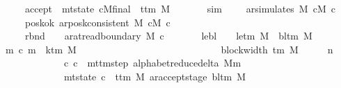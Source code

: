 \begin{isabellebody}
\ \ \ \ \ \ \ accept{\isacharcolon}{\kern0pt}\ \ {\isachardoublequoteopen}mt{\isacharunderscore}{\kern0pt}state\ cM{\isacharunderscore}{\kern0pt}final\ {\isacharequal}{\kern0pt}\ t{\isacharunderscore}{\kern0pt}tm\ M{\isachardoublequoteclose}\isanewline
\ \ \ \ \ \ \ sim{\isacharcolon}{\kern0pt}\ \ \ \ \ {\isachardoublequoteopen}ar{\isacharunderscore}{\kern0pt}simulates\ M\ cM\ c{\isacharprime}{\kern0pt}{\isachardoublequoteclose}\isanewline
\ \ \ \ \ \ \ posk{\isacharunderscore}{\kern0pt}ok{\isacharcolon}{\kern0pt}\ {\isachardoublequoteopen}ar{\isacharunderscore}{\kern0pt}posk{\isacharunderscore}{\kern0pt}consistent\ M\ cM\ c{\isacharprime}{\kern0pt}{\isachardoublequoteclose}\isanewline
\ \ \ \ \ \ \ rbnd{\isacharcolon}{\kern0pt}\ \ \ \ {\isachardoublequoteopen}ar{\isacharunderscore}{\kern0pt}at{\isacharunderscore}{\kern0pt}read{\isacharunderscore}{\kern0pt}boundary\ M\ c{\isacharprime}{\kern0pt}{\isachardoublequoteclose}\isanewline
\ \ \ \ \ \ \ lebl{\isacharcolon}{\kern0pt}\ \ \ \ {\isachardoublequoteopen}le{\isacharunderscore}{\kern0pt}tm\ M\ {\isasymnoteq}\ bl{\isacharunderscore}{\kern0pt}tm\ M{\isachardoublequoteclose}\isanewline
\ \ \ {\isachardoublequoteopen}{\isasymexists}m\ c{\isacharprime}{\kern0pt}{\isacharprime}{\kern0pt}{\isachardot}{\kern0pt}\ m\ {\isasymle}\ {\isacharparenleft}{\kern0pt}k{\isacharunderscore}{\kern0pt}tm\ M\isanewline
\ \ \ \ \ \ \ \ \ \ \ \ \ \ \ \ \ \ \ \ \ \ \ \ \ \ {\isacharasterisk}{\kern0pt}\ {\isacharparenleft}{\kern0pt}{}\ {\isacharasterisk}{\kern0pt}\ block{\isacharunderscore}{\kern0pt}width\ {\isacharparenleft}{\kern0pt}{\isasymGamma}{\isacharunderscore}{\kern0pt}tm\ M{\isacharparenright}{\kern0pt}\ {\isacharplus}{\kern0pt}\ {}{\isacharparenright}{\kern0pt}\ {\isacharplus}{\kern0pt}\ {}{\isacharparenright}{\kern0pt}\ {\isacharasterisk}{\kern0pt}\ n\isanewline
\ \ \ \ \ \ \ \ \ \ \ \ \ \ {\isasymand}\ {\isacharparenleft}{\kern0pt}c{\isacharprime}{\kern0pt}{\isacharcomma}{\kern0pt}\ c{\isacharprime}{\kern0pt}{\isacharprime}{\kern0pt}{\isacharparenright}{\kern0pt}\ {\isasymin}\ {\isacharparenleft}{\kern0pt}mttm{\isacharunderscore}{\kern0pt}step\ {\isacharparenleft}{\kern0pt}alphabet{\isacharunderscore}{\kern0pt}reduce{\isacharunderscore}{\kern0pt}delta\ M{\isacharparenright}{\kern0pt}{\isacharparenright}{\kern0pt}{\isacharcircum}{\kern0pt}{\isacharcircum}{\kern0pt}m\isanewline
\ \ \ \ \ \ \ \ \ \ \ \ \ \ {\isasymand}\ mt{\isacharunderscore}{\kern0pt}state\ c{\isacharprime}{\kern0pt}{\isacharprime}{\kern0pt}\ {\isacharequal}{\kern0pt}\ {\isacharparenleft}{\kern0pt}t{\isacharunderscore}{\kern0pt}tm\ M{\isacharcomma}{\kern0pt}\ ar{\isacharunderscore}{\kern0pt}accept{\isacharunderscore}{\kern0pt}stage\ {\isacharparenleft}{\kern0pt}bl{\isacharunderscore}{\kern0pt}tm\ M{\isacharparenright}{\kern0pt}{\isacharparenright}{\kern0pt}{\isachardoublequoteclose}\isanewline

\end{isabellebody}
